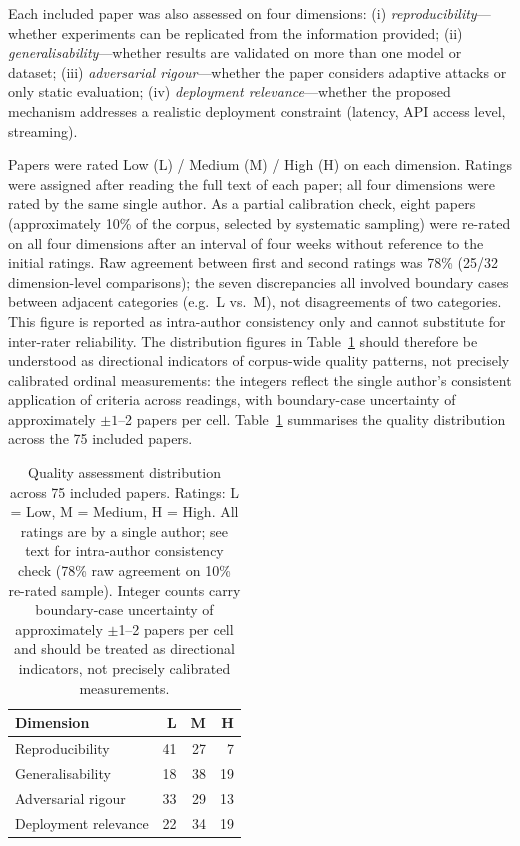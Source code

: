 Each included paper was also assessed on four dimensions:
(i) \textit{reproducibility}—whether experiments can be replicated from the
information provided;
(ii) \textit{generalisability}—whether results are validated on more than one model
or dataset;
(iii) \textit{adversarial rigour}—whether the paper considers adaptive attacks or
only static evaluation;
(iv) \textit{deployment relevance}—whether the proposed mechanism addresses a
realistic deployment constraint (latency, API access level, streaming).

\noindent Papers were rated Low (L) / Medium (M) / High (H) on each dimension.
Ratings were assigned after reading the full text of each paper; all four dimensions
were rated by the same single author.
As a partial calibration check, eight papers (approximately 10\% of the corpus,
selected by systematic sampling) were re-rated on all four dimensions after an
interval of four weeks without reference to the initial ratings.
Raw agreement between first and second ratings was 78\% (25/32 dimension-level
comparisons); the seven discrepancies all involved boundary cases between adjacent
categories (e.g.\ L vs.\ M), not disagreements of two categories.
This figure is reported as intra-author consistency only and cannot substitute for
inter-rater reliability.
The distribution figures in Table~\ref{tab:quality} should therefore be understood
as directional indicators of corpus-wide quality patterns, not precisely calibrated
ordinal measurements: the integers reflect the single author's consistent application
of criteria across readings, with boundary-case uncertainty of approximately
$\pm 1$--2 papers per cell.
Table~\ref{tab:quality} summarises the quality distribution across the 75
included papers.

\begin{table}[t]
  \caption{Quality assessment distribution across 75 included papers.
           Ratings: L = Low, M = Medium, H = High.
           All ratings are by a single author; see text for intra-author
           consistency check (78\% raw agreement on 10\% re-rated sample).
           Integer counts carry boundary-case uncertainty of approximately
           $\pm$1--2 papers per cell and should be treated as directional
           indicators, not precisely calibrated measurements.}
  \label{tab:quality}
  \centering
  \begin{tabular}{lrrr}
    \toprule
    \textbf{Dimension} & \textbf{L} & \textbf{M} & \textbf{H} \\
    \midrule
    Reproducibility       & 41 & 27 & 7  \\
    Generalisability      & 18 & 38 & 19 \\
    Adversarial rigour    & 33 & 29 & 13 \\
    Deployment relevance  & 22 & 34 & 19 \\
    \bottomrule
  \end{tabular}
\end{table}

